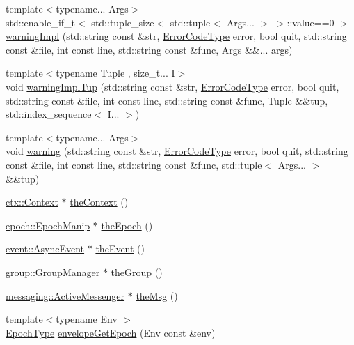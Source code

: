 \begin{DoxyCompactItemize}
\item 
{\footnotesize template$<$typename... Args$>$ }\\std\+::enable\+\_\+if\+\_\+t$<$ std\+::tuple\+\_\+size$<$ std\+::tuple$<$ Args... $>$ $>$\+::value==0 $>$ \hyperlink{namespacevt_a118ef4729cf1e1516a3efef8da49efbf}{warning\+Impl} (std\+::string const \&str, \hyperlink{namespacevt_a793764d753923abc3d32929870beb485}{Error\+Code\+Type} error, bool quit, std\+::string const \&file, int const line, std\+::string const \&func, Args \&\&... args)
\item 
{\footnotesize template$<$typename Tuple , size\+\_\+t... I$>$ }\\void \hyperlink{namespacevt_af998935c41a6f414a373f182156d72e3}{warning\+Impl\+Tup} (std\+::string const \&str, \hyperlink{namespacevt_a793764d753923abc3d32929870beb485}{Error\+Code\+Type} error, bool quit, std\+::string const \&file, int const line, std\+::string const \&func, Tuple \&\&tup, std\+::index\+\_\+sequence$<$ I... $>$)
\item 
{\footnotesize template$<$typename... Args$>$ }\\void \hyperlink{namespacevt_af11de63df5da8fa58bd668f4e5026a72}{warning} (std\+::string const \&str, \hyperlink{namespacevt_a793764d753923abc3d32929870beb485}{Error\+Code\+Type} error, bool quit, std\+::string const \&file, int const line, std\+::string const \&func, std\+::tuple$<$ Args... $>$ \&\&tup)
\item 
\hyperlink{structvt_1_1ctx_1_1_context}{ctx\+::\+Context} $\ast$ \hyperlink{namespacevt_a26551fe0e6e6a1371111df5b12c7e92c}{the\+Context} ()
\item 
\hyperlink{structvt_1_1epoch_1_1_epoch_manip}{epoch\+::\+Epoch\+Manip} $\ast$ \hyperlink{namespacevt_ad246530e523687095c567ccab203556a}{the\+Epoch} ()
\item 
\hyperlink{structvt_1_1event_1_1_async_event}{event\+::\+Async\+Event} $\ast$ \hyperlink{namespacevt_aa297fcaadc8a330890eb90c5b0081ec5}{the\+Event} ()
\item 
\hyperlink{structvt_1_1group_1_1_group_manager}{group\+::\+Group\+Manager} $\ast$ \hyperlink{namespacevt_a4548473dce44fb654400009e2b2fe64e}{the\+Group} ()
\item 
\hyperlink{structvt_1_1messaging_1_1_active_messenger}{messaging\+::\+Active\+Messenger} $\ast$ \hyperlink{namespacevt_aeafd31f866aeb4dc6fc2f6ee97136350}{the\+Msg} ()
\item 
{\footnotesize template$<$typename Env $>$ }\\\hyperlink{namespacevt_a81d11b28122d43bf9834577e4a06440f}{Epoch\+Type} \hyperlink{namespacevt_ad5495e7900227550b44837e899c5bb13}{envelope\+Get\+Epoch} (Env const \&env)

\end{DoxyCompactItemize}
